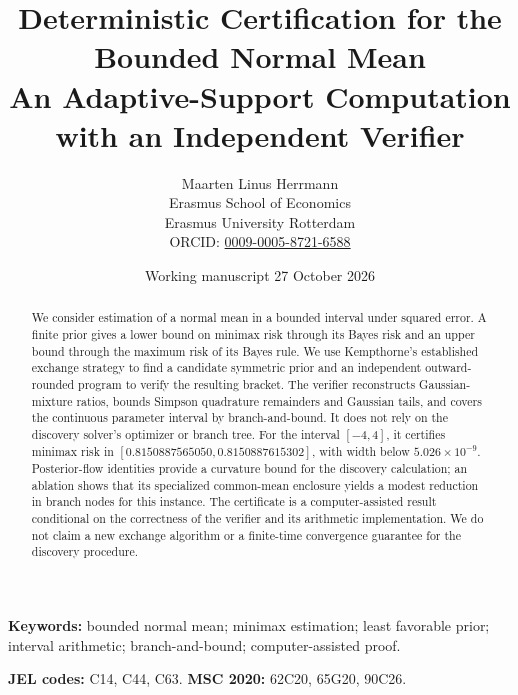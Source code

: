 \documentclass[10pt]{article}
\title{\textbf{Deterministic Certification for the Bounded Normal Mean}\\
\large An Adaptive-Support Computation with an Independent Verifier}
\author{
Maarten Linus Herrmann\\
\small Erasmus School of Economics\\
\small Erasmus University Rotterdam\\
\small ORCID: \href{https://orcid.org/0009-0005-8721-6588}{0009-0005-8721-6588}
}
\date{Working manuscript \textbullet{} 27 October 2026}
\begin{document}
\maketitle

\begin{abstract}
We consider estimation of a normal mean in a bounded interval under squared
error. A finite prior gives a lower bound on minimax risk through its Bayes
risk and an upper bound through the maximum risk of its Bayes rule. We use
Kempthorne's established exchange strategy to find a candidate symmetric prior
and an independent outward-rounded program to verify the resulting bracket.
The verifier reconstructs Gaussian-mixture ratios, bounds Simpson quadrature
remainders and Gaussian tails, and covers the continuous parameter interval
by branch-and-bound. It does not rely on the discovery solver's optimizer or
branch tree. For the interval $[-4,4]$, it certifies minimax risk in
$[0.8150887565050,0.8150887615302]$, with width below
$5.026\times10^{-9}$. Posterior-flow identities provide a curvature
bound for the discovery calculation; an ablation shows that its specialized
common-mean enclosure yields a modest reduction in branch nodes for this
instance. The certificate is a computer-assisted result conditional on the
correctness of the verifier and its arithmetic implementation. We do not
claim a new exchange algorithm or a finite-time convergence guarantee for
the discovery procedure.
\end{abstract}

\noindent\textbf{Keywords:} bounded normal mean; minimax estimation; least
favorable prior; interval arithmetic; branch-and-bound; computer-assisted
proof.

\noindent\textbf{JEL codes:} C14, C44, C63.
\qquad
\textbf{MSC 2020:} 62C20, 65G20, 90C26.












\appendix







\end{document}
